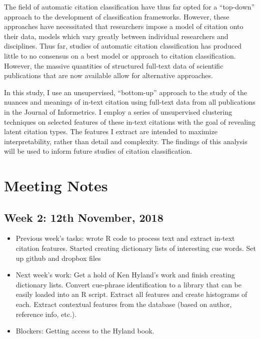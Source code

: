 \documentclass[
10pt, %
a4paper, %
oneside, %
headinclude,footinclude, %
BCOR5mm, %
]{scrartcl}
\begin{document}
The field of automatic citation classification have thus far opted for a “top-down” approach to the development of classification frameworks. However, these approaches have necessitated that researchers impose a model of citation onto their data, models which vary greatly between individual researchers and disciplines. Thus far, studies of automatic citation classification has produced little to no consensus on a best model or approach to citation classification. However, the massive quantities of structured full-text data of scientific publications that are now available allow for alternative approaches. 

In this study, I use an unsupervised, “bottom-up” approach to the study of the nuances and meanings of in-text citation using full-text data from all publications in the Journal of Informetrics. I employ a series of unsupervised clustering techniques on selected features of these in-text citations with the goal of revealing latent citation types. The features I extract are intended to maximize interpretability, rather than detail and complexity. The findings of this analysis will be used to inform future studies of citation classification. 

 


\section{Meeting Notes}

\subsection{Week 2: 12th November, 2018}
\begin{itemize}
\item Previous week's tasks: wrote R code to process text and extract in-text citation features. Started creating dictionary lists of interesting cue words. Set up github and dropbox files
\item Next week's work: Get a hold of Ken Hyland's work and finish creating dictionary lists. Convert cue-phrase identification to a library that can be easily loaded into an R script. Extract all features and create histograms of each. Extract contextual features from the database (based on author, reference info, etc.). 
\item Blockers: Getting access to the Hyland book. 
\end{itemize}
\end{document}
